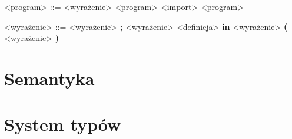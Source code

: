 \documentclass[12pt]{article}
\begin{document}
\begin{grammar}

<program> ::= 
    <wyrażenie>
     <program>
    \alt <import> <program>

<wyrażenie> ::=
    <wyrażenie> \textbf{;} <wyrażenie>
    \alt <definicja> \textbf{in} <wyrażenie>
    \alt \textbf{(} <wyrażenie> \textbf{)}


\end{grammar}

\section{Semantyka}

\section{System typów}
\end{document}
